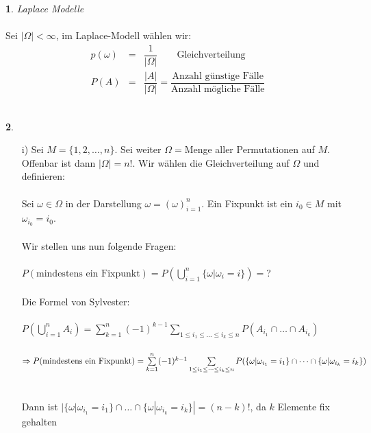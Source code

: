 \documentclass[10pt,a4paper]{report}
\numberwithin{equation}{section}
\numberwithin{figure}{section}
\theoremstyle{plain}
\theoremstyle{definition}
\theoremstyle{plain}
\theoremstyle{definition}
\newtheorem{example}{\protect\examplename}[section]
\theoremstyle{remark}
\theoremstyle{plain}
\theoremstyle{plain}
\theoremstyle{plain}
\theoremstyle{plain}
\theoremstyle{plain}
\providecommand{\examplename}{Beispiel}
\newcommand{\1}{ \mathbb{1} } %
\begin{document}
\begin{example}
  \textit{Laplace Modelle}\\\\
  Sei $|\Omega|<\infty$, im Laplace-Modell wählen wir:
  \begin{eqnarray*}
    p(\omega)&=&\dfrac{1}{|\Omega|} \qquad \text{Gleichverteilung}\\
    P(A)&=&\dfrac{|A|}{|\Omega|}=\dfrac{\text{Anzahl günstige Fälle}}{\text{Anzahl mögliche Fälle}}
  \end{eqnarray*}
  \\
\end{example}
\begin{example}
  \begin{itemize}
  \item[i)] Sei $M=\{1,2,\dots,n\}$. Sei weiter $\Omega=$Menge aller Permutationen auf $M$. Offenbar ist dann $|\Omega|=n!$. Wir wählen die Gleichverteilung auf $\Omega$ und definieren:\\\\
    Sei $\omega \in \Omega$ in der Darstellung $\omega=(\omega)_{i=1}^n$. Ein Fixpunkt ist ein $i_0 \in M$ mit $\omega_{i_0}=i_0$.\\\\
    Wir stellen uns nun folgende Fragen:\\\\
    $P(\text{mindestens ein Fixpunkt})=P\left(\bigcup\limits_{i=1}^n \{\omega|\omega_i=i\}\right)=$?\\\\
    Die Formel von Sylvester:\\\\
    $P\left(\bigcup\limits_{i=1}^nA_i\right)=\sum\limits_{k=1}^n(-1)^{k-1}\sum\limits_{1\leq i_1 \leq \dots \leq i_k \leq n}P(A_{i_1}\cap\dots\cap A_{i_k})$\\\\
    $\Rightarrow P(\text{mindestens ein Fixpunkt})\\\\
    =\sum\limits_{k=1}^n(-1)^{k-1}\sum\limits_{1\leq i_1 \leq \dots \leq i_k \leq n}P(\{\omega|\omega_{i_1}=i_1\}\cap\dots\cap \{\omega|\omega_{i_k}=i_k\})$\\\\\\
    Dann ist $|\{\omega|\omega_{i_1}=i_1\}\cap\dots\cap
    \{\omega|\omega_{i_k}=i_k\}|=(n-k)!$, da $k$ Elemente fix gehalten

\end{itemize}
\end{example}
\end{document}
